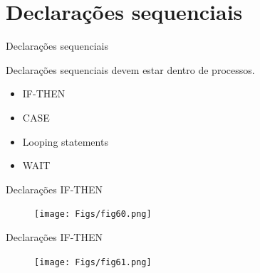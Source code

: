 \documentclass[aspectratio=169]{beamer}
\begin{document}
\section{Declarações sequenciais}
\begin{frame}{Declarações sequenciais}
	\justifying
	
	Declarações sequenciais devem estar dentro de processos.
	
	\begin{block}{}
	\begin{itemize}
		\item IF-THEN
		\item CASE 
		\item Looping statements
		\item WAIT
	\end{itemize}
	
	\end{block}		

\end{frame}
\begin{frame}{Declarações IF-THEN}
	\justifying
	
	\begin{figure}[h]
	\centering
	\texttt{[image: Figs/fig60.png]}
	\end{figure}
	
	
	
\end{frame}
\begin{frame}{Declarações IF-THEN}
	\justifying
	
	\begin{figure}[h]
		\centering
		\texttt{[image: Figs/fig61.png]}
	\end{figure}
	
	
	
\end{frame}
\end{document}
